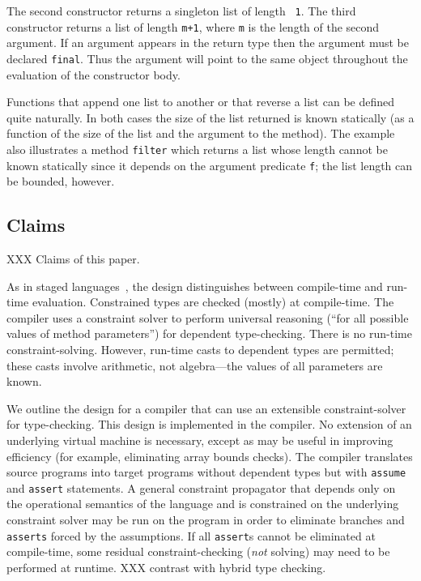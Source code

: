 The 
second constructor returns a singleton list of length {\tt
1}. The third constructor returns a list of length {\tt m+1}, where
{\tt m} is the length of the second argument. 
If an argument appears in the return type then the argument must be
declared {\tt final}. Thus the argument will point to the same object
throughout the evaluation of the constructor body.

Functions that append one list to another or that reverse a list can
be defined quite naturally. In both cases the size of the list
returned is known statically (as a function of the size of the list
and the argument to the method).  The example also illustrates a
method {\tt filter} which returns a list whose length cannot be known
statically since it depends on the argument predicate {\tt f};
the list length can be bounded, however.

\subsection{Claims}

XXX Claims of this paper.

%
%

As in staged languages~\cite{nielson-multistage,ts97-multistage},
the design distinguishes between
compile-time and run-time evaluation. Constrained types are
checked (mostly) at compile-time.
The compiler uses a
constraint solver to perform universal reasoning (``for all possible
values of method parameters'') for dependent type-checking.  There is
no run-time constraint-solving.  However,
run-time casts to dependent types are
permitted; these casts involve arithmetic, not
algebra---the values of all parameters are known.

We outline the design for a compiler that can use an extensible
constraint-solver for type-checking.
This design is implemented in the \Xten{} compiler.
No extension of an
underlying virtual machine is necessary, except as may be useful in
improving efficiency (for example, eliminating array bounds checks).
The compiler translates source
programs into target programs without dependent types
but with {\tt assume} and {\tt assert} statements.
A general
constraint propagator that depends only on the operational semantics
of the language and is constrained on the underlying constraint solver
may be run on the program in order to eliminate branches and {\tt
asserts} forced by the assumptions. If all {\tt assert}s cannot be
eliminated at compile-time, some residual constraint-checking
({\em not} solving) may need to be performed at runtime.
%
XXX contrast with hybrid type checking.

